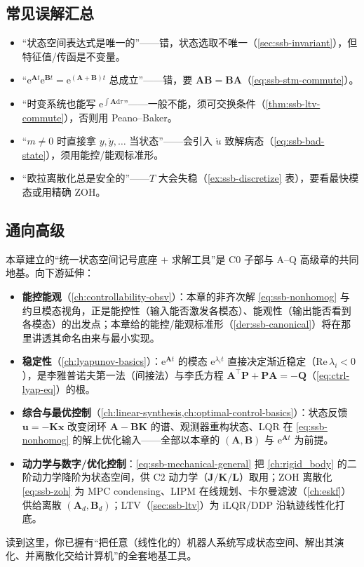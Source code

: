 \subsection*{常见误解汇总}
\begin{itemize}
  \item “状态空间表达式是唯一的”——错，状态选取不唯一（\cref{sec:ssb-invariant}），但特征值/传函是不变量。
  \item “$\mathrm{e}^{\mathbf{A}t}\mathrm{e}^{\mathbf{B}t}=\mathrm{e}^{(\mathbf{A}+\mathbf{B})t}$ 总成立”——错，要 $\mathbf{A}\mathbf{B}=\mathbf{B}\mathbf{A}$（\cref{eq:ssb-stm-commute}）。
  \item “时变系统也能写 $\mathrm{e}^{\int\mathbf{A}\mathrm{d}\tau}$”——一般不能，须可交换条件（\cref{thm:ssb-ltv-commute}），否则用 Peano--Baker。
  \item “$m\neq0$ 时直接拿 $y,\dot y,\dots$ 当状态”——会引入 $\dot u$ 致解病态（\cref{eq:ssb-bad-state}），须用能控/能观标准形。
  \item “欧拉离散化总是安全的”——$T$ 大会失稳（\cref{ex:ssb-discretize} 表），要看最快模态或用精确 ZOH。
\end{itemize}

\subsection*{通向高级}
本章建立的“统一状态空间记号底座 $+$ 求解工具”是 C0 子部与 A--Q 高级章的共同地基。向下游延伸：
\begin{itemize}
  \item \textbf{能控能观}（\cref{ch:controllability-obsv}）：本章的非齐次解 \cref{eq:ssb-nonhomog} 与约旦模态视角，正是能控性（输入能否激发各模态）、能观性（输出能否看到各模态）的出发点；本章给的能控/能观标准形（\cref{der:ssb-canonical}）将在那里讲透其命名由来与最小实现。
  \item \textbf{稳定性}（\cref{ch:lyapunov-basics}）：$\mathrm{e}^{\mathbf{A}t}$ 的模态 $\mathrm{e}^{\lambda_i t}$ 直接决定渐近稳定（$\mathrm{Re}\,\lambda_i<0$），是李雅普诺夫第一法（间接法）与李氏方程 $\mathbf{A}^\top\mathbf{P}+\mathbf{P}\mathbf{A}=-\mathbf{Q}$（\cref{eq:ctrl-lyap-eq}）的根。
  \item \textbf{综合与最优控制}（\cref{ch:linear-synthesis,ch:optimal-control-basics}）：状态反馈 $\mathbf{u}=-\mathbf{K}\mathbf{x}$ 改变闭环 $\mathbf{A}-\mathbf{B}\mathbf{K}$ 的谱、观测器重构状态、LQR 在 \cref{eq:ssb-nonhomog} 的解上优化输入——全部以本章的 $(\mathbf{A},\mathbf{B})$ 与 $\mathrm{e}^{\mathbf{A}t}$ 为前提。
  \item \textbf{动力学与数字/优化控制}：\cref{eq:ssb-mechanical-general} 把 \cref{ch:rigid_body} 的二阶动力学降阶为状态空间，供 C2 动力学（$\mathbf{J}/\mathbf{K}/\mathbf{L}$）取用；ZOH 离散化 \cref{eq:ssb-zoh} 为 MPC condensing、LIPM 在线规划、卡尔曼滤波（\cref{ch:eskf}）供给离散 $(\mathbf{A}_d,\mathbf{B}_d)$；LTV（\cref{sec:ssb-ltv}）为 iLQR/DDP 沿轨迹线性化打底。
\end{itemize}
读到这里，你已握有“把任意（线性化的）机器人系统写成状态空间、解出其演化、并离散化交给计算机”的全套地基工具。
